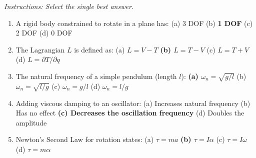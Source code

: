 \documentclass[12pt, a4paper]{article}
\begin{document}
\textit{Instructions: Select the single best answer.}

\begin{enumerate}[label=PK\arabic*.]
  \item A rigid body constrained to rotate in a plane has:
    (a) 3 DOF \quad (b) \textbf{1 DOF} \quad (c) 2 DOF \quad
    (d) 0 DOF

  \item The Lagrangian $L$ is defined as:
    (a) $L = V - T$ \quad \textbf{(b) $L = T - V$} \quad
    (c) $L = T + V$ \quad (d) $L = \partial T/\partial q$

  \item The natural frequency of a simple pendulum (length $l$):
    \textbf{(a) $\omega_n = \sqrt{g/l}$} \quad
    (b) $\omega_n = \sqrt{l/g}$ \quad
    (c) $\omega_n = g/l$ \quad (d) $\omega_n = l/g$

  \item Adding viscous damping to an oscillator:
    (a) Increases natural frequency \quad
    (b) Has no effect \quad
    \textbf{(c) Decreases the oscillation frequency} \quad
    (d) Doubles the amplitude

  \item Newton's Second Law for rotation states:
    (a) $\tau = ma$ \quad \textbf{(b) $\tau = I\alpha$} \quad
    (c) $\tau = I\omega$ \quad (d) $\tau = m\alpha$
\end{enumerate}
\end{document}
